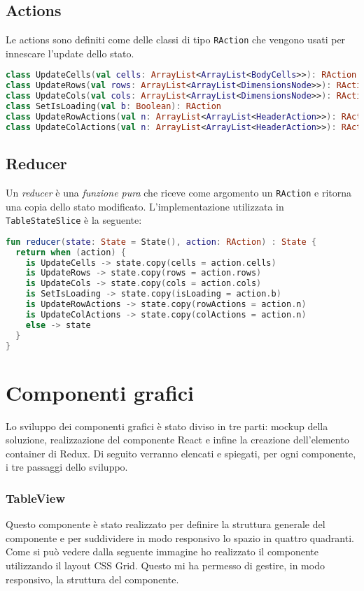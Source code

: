 \subsection{Actions}
Le actions sono definiti come delle classi di tipo \verb|RAction| che vengono usati per innescare l'update dello stato.

\begin{lstlisting}[caption={Actions}, label={lst:bodycells}, language=Kotlin]
class UpdateCells(val cells: ArrayList<ArrayList<BodyCells>>): RAction
class UpdateRows(val rows: ArrayList<ArrayList<DimensionsNode>>): RAction
class UpdateCols(val cols: ArrayList<ArrayList<DimensionsNode>>): RAction
class SetIsLoading(val b: Boolean): RAction
class UpdateRowActions(val n: ArrayList<ArrayList<HeaderAction>>): RAction
class UpdateColActions(val n: ArrayList<ArrayList<HeaderAction>>): RAction
\end{lstlisting}

\subsection{Reducer}
Un \emph{reducer} è una \emph{funzione pura} che riceve come argomento un \verb|RAction| e ritorna una copia dello stato modificato. L'implementazione utilizzata in \verb|TableStateSlice| è la seguente:
\begin{lstlisting}[caption={Reducer}, label={lst:bodycells}, language=Kotlin]
fun reducer(state: State = State(), action: RAction) : State {
  return when (action) {
    is UpdateCells -> state.copy(cells = action.cells)
    is UpdateRows -> state.copy(rows = action.rows)
    is UpdateCols -> state.copy(cols = action.cols)
    is SetIsLoading -> state.copy(isLoading = action.b)
    is UpdateRowActions -> state.copy(rowActions = action.n)
    is UpdateColActions -> state.copy(colActions = action.n)
    else -> state
  }
}
\end{lstlisting}

\section{Componenti grafici}
Lo sviluppo dei componenti grafici è stato diviso in tre parti: mockup della soluzione, realizzazione del componente React e infine la creazione dell'elemento container di Redux. Di seguito verranno elencati e spiegati, per ogni componente, i tre passaggi dello sviluppo.
\subsubsection{TableView}
Questo componente è stato realizzato per definire la struttura generale del componente e per suddividere in modo responsivo lo spazio in quattro quadranti. Come si può vedere dalla seguente immagine ho realizzato il componente utilizzando il layout CSS Grid. Questo mi ha permesso di gestire, in modo responsivo, la struttura del componente.

